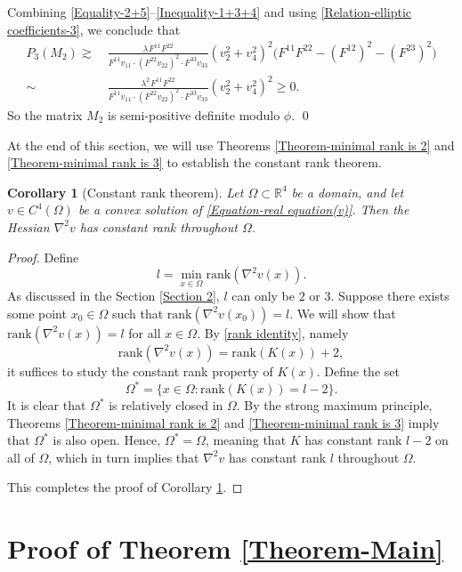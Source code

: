 \documentclass[11pt]{amsart}
\newtheorem{corollary}[theorem]{Corollary}
\numberwithin{theorem}{section}
\numberwithin{equation}{section}
\begin{document}
Combining \eqref{Equality-2+5}--\eqref{Inequality-1+3+4} and using \eqref{Relation-elliptic coefficients-3}, we conclude that 
\begin{align*}
P_3(M_2)\gtrsim&~\frac{\lambda\hspace{1pt}F^{11}F^{22}}{F^{11}v_{11}\cdot (F^{22}v_{22})^2\cdot F^{33}v_{33}}(v_2^2+v_4^2)^2\bigg(F^{11}F^{22}-(F^{12})^2-(F^{23})^2\bigg)\\
\sim&~\frac{\lambda^2\hspace{1pt}F^{11}F^{22}}{F^{11}v_{11}\cdot (F^{22}v_{22})^2\cdot F^{33}v_{33}}(v_2^2+v_4^2)^2\geq0.
\end{align*}
So the matrix $M_2$ is semi-positive definite modulo $\phi$. \qed

\vspace{5pt} At the end of this section, we will use Theorems \ref{Theorem-minimal rank is 2} and \ref{Theorem-minimal rank is 3} to establish the constant rank theorem.
\begin{corollary}[Constant rank theorem]\label{Corollary}
Let $\Omega\subset\mathbb{R}^4$ be a domain, and let $v\in C^4(\Omega)$ be a convex solution of \eqref{Equation-real equation(v)}. Then the Hessian $\nabla^2v$ has constant rank throughout $\Omega$.
\end{corollary}
\begin{proof}
Define $$l=\min_{x\in\Omega}\mathrm{rank}(\nabla^2v(x)). $$ As discussed in the Section \ref{Section 2}, $l$ can only be $2$ or $3$. Suppose there exists some point $x_0\in\Omega$ such that $\mathrm{rank}(\nabla^2v(x_0))=l$. We will show that $\mathrm{rank}(\nabla^2v(x))=l$ for all $x\in\Omega$. By \eqref{rank identity}, namely $$\mathrm{rank}(\nabla^2v(x))=\mathrm{rank}(K(x))+2,$$ it suffices to study the constant rank property of $K(x)$. Define the set $$\Omega^\ast=\{x\in\Omega: \mathrm{rank}(K(x))=l-2\}. $$ It is clear that $\Omega^\ast$ is relatively closed in $\Omega$. By the strong maximum principle, Theorems \ref{Theorem-minimal rank is 2} and \ref{Theorem-minimal rank is 3} imply that $\Omega^\ast$ is also open. Hence, $\Omega^\ast=\Omega$, meaning that $K$ has constant rank $l-2$ on all of $\Omega$, which in turn implies that $\nabla^2v$ has constant rank $l$ throughout $\Omega$.

This completes the proof of Corollary \ref{Corollary}.
\end{proof}


\section{Proof of Theorem \ref{Theorem-Main}}\label{Section 4}
\end{document}
